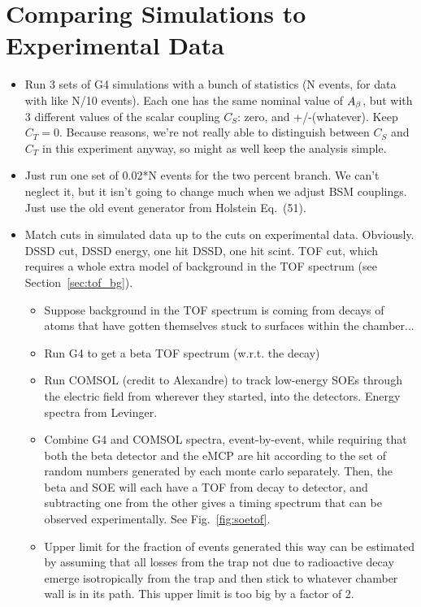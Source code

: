 \section{Comparing Simulations to Experimental Data}
\begin{itemize}
	\item Run 3 sets of G4 simulations with a bunch of statistics (N events, for data with like N/10 events).  Each one has the same nominal value of $A_{\beta}$, but with 3 different values of the scalar coupling $C_S$:  zero, and +/-(whatever).  Keep $C_T=0$.  Because reasons, we're not really able to distinguish between $C_S$ and $C_T$ in this experiment anyway, so might as well keep the analysis simple.
	\item Just run one set of 0.02*N events for the two percent branch.  We can't neglect it, but it isn't going to change much when we adjust BSM couplings.  Just use the old event generator from Holstein Eq.~(51).
	\item Match cuts in simulated data up to the cuts on experimental data.  Obviously.  DSSD cut, DSSD energy, one hit DSSD, one hit scint.  TOF cut, which requires a whole extra model of background in the TOF spectrum (see Section~\ref{sec:tof_bg}).
	\begin{itemize}
		\item Suppose background in the TOF spectrum is coming from decays of atoms that have gotten themselves stuck to surfaces within the chamber...
		\item Run G4 to get a beta TOF spectrum (w.r.t. the decay)
		\item Run COMSOL (credit to Alexandre) to track low-energy SOEs through the electric field from wherever they started, into the detectors.  Energy spectra from Levinger.
		\item Combine G4 and COMSOL spectra, event-by-event, while requiring that both the beta detector and the eMCP are hit according to the set of random numbers generated by each monte carlo separately.  Then, the beta and SOE will each have a TOF from decay to detector, and subtracting one from the other gives a timing spectrum that can be observed experimentally.  See Fig.~\ref{fig:soetof}.
		\item Upper limit for the fraction of events generated this way can be estimated by assuming that all losses from the trap not due to radioactive decay emerge isotropically from the trap and then stick to whatever chamber wall is in its path.  This upper limit is too big by a factor of 2.

\end{itemize}
\end{itemize}
